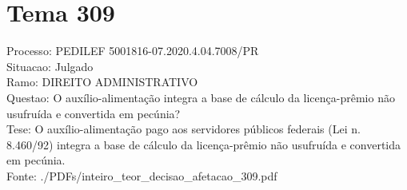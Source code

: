 \documentclass[12pt]{article}
\begin{document}
\section*{Tema 309}
Processo: PEDILEF 5001816-07.2020.4.04.7008/PR\\
Situacao: Julgado\\
Ramo: DIREITO ADMINISTRATIVO\\
Questao: O auxílio-alimentação integra a base de cálculo da licença-prêmio não usufruída e convertida em pecúnia?\\
Tese: O auxílio-alimentação pago aos servidores públicos federais (Lei n. 8.460/92) integra a base de cálculo da licença-prêmio não usufruída e convertida em pecúnia.\\
Fonte: ./PDFs/inteiro\_teor\_decisao\_afetacao\_309.pdf
\end{document}
